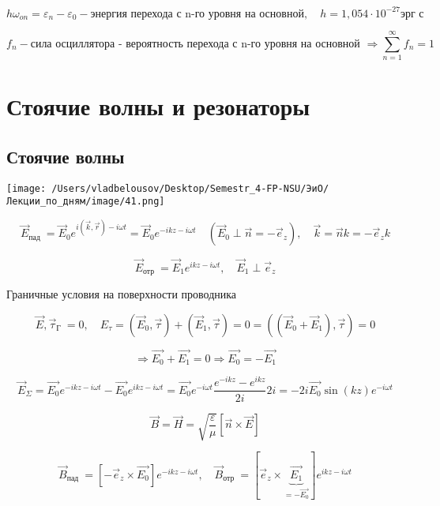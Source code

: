 \documentclass[12pt, a4paper]{report}
\begin{document}
\[ h \omega _{on     } = \varepsilon_n -\varepsilon_0 - \text{энергия перехода с n-го уровня на основной} ,\quad  h = 1,054 \cdot 10 ^{-27} \text{эрг с }    \]  

\[ f_n - \text{сила осциллятора - вероятность перехода с n-го уровня на основной  } \Rightarrow \sum_{n =1} ^{\infty  } f_n = 1   \] 

\chapter{Стоячие волны и резонаторы}

\section{Стоячие волны}

\begin{center}
    \texttt{[image: /Users/vladbelousov/Desktop/Semestr\_4-FP-NSU/ЭиО/Лекции\_по\_дням/image/41.png]}
\end{center}

\[ \vec{E } _{\text{пад } } =   \vec{E }  _ 0 e^{i (\vec{k},\vec{r }     )- i \omega t }  = \vec{E } _0 e^{- i k z - i \omega t } \quad ( \vec{E } _0 \perp \vec{n }  = - \vec{e } _z ), \quad \vec{k } = \vec{n } k = - \vec{e }_z k\] 

\[ \vec{E } _{\text{отр }  } = \vec{E } _1 e^{i kz - i \omega t }, \quad  \vec{E } _1 \perp \vec{e }_z     \] 

Граничные условия на поверхности проводника

\[ \vec{E } , \vec{\tau }_{\text{Г } } = 0 , \quad E_{\tau } =( \vec{E } _ 0 ,\vec{\tau } )+ ( \vec{E } _ 1 , \vec{\tau } ) = 0 = ((\vec{E } _0 + \vec{E } _1), \vec{\tau } )= 0      \] 

\[ \Rightarrow \vec{E_0} + \vec{E_1 } = 0 \Rightarrow \vec{E_0 } = -\vec{E_1}      \] 

\[ \vec{E}_{\Sigma } = \vec{E_0 }e^{ - i kz - i\omega t}  - \vec{E_0 }e^{i kz - i \omega t } = \vec{E_0 }e^{- i \omega t } \frac{ e^{- ikz } - e^{i kz } }{2i } 2 i= -2i \vec{E_0 }\sin (kz) e^{- i \omega t }          \] 

\[ \vec{B }  = \vec{H }  = \sqrt{\frac{ \varepsilon }{\mu } } [ \vec{n } \times  \vec{E } ]  \]

\[ \vec{B }_{\text{пад } } = [ - \vec{e } _z \times  \vec{E_0}  ]   e^{- ikz - i \omega t } , \quad  \vec{B }_{\text{отр } } = [  \vec{e } _z \times  \underbrace{\vec{E_1 }}_{= - \vec{E_0} } ] e^{ikz - i \omega t } \] 
\end{document}
